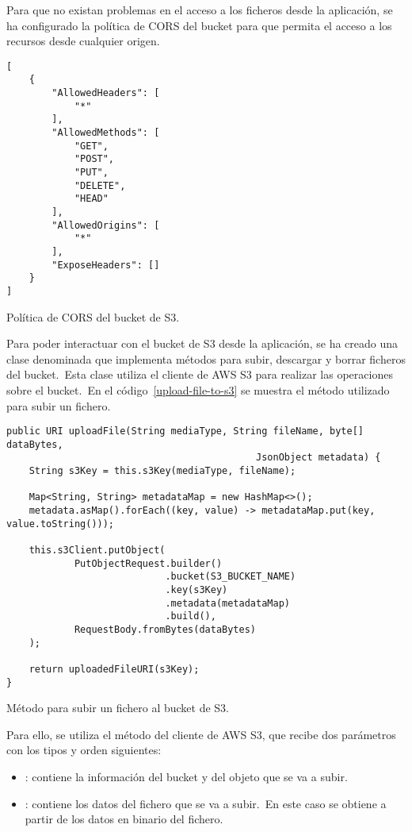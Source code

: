 Para que no existan problemas en el acceso a los ficheros desde la aplicación, se ha configurado la política de CORS
del bucket para que permita el acceso a los recursos desde cualquier origen.

\begin{codeBlock}
	\begin{verbatim}
[
	{
		"AllowedHeaders": [
			"*"
		],
		"AllowedMethods": [
			"GET",
			"POST",
			"PUT",
			"DELETE",
			"HEAD"
		],
		"AllowedOrigins": [
			"*"
		],
		"ExposeHeaders": []
	}
]
	\end{verbatim}
	\caption{Política de CORS del bucket de S3.}
\end{codeBlock}

Para poder interactuar con el bucket de S3 desde la aplicación, se ha creado una clase denominada  que
implementa métodos para subir, descargar y borrar ficheros del bucket.\ Esta clase utiliza el cliente de AWS S3
para realizar las operaciones sobre el bucket.\ En el código~\ref{upload-file-to-s3} se muestra el método utilizado
para subir un fichero.

\begin{codeBlock}
	\begin{verbatim}
public URI uploadFile(String mediaType, String fileName, byte[] dataBytes,
											JsonObject metadata) {
	String s3Key = this.s3Key(mediaType, fileName);

	Map<String, String> metadataMap = new HashMap<>();
	metadata.asMap().forEach((key, value) -> metadataMap.put(key, value.toString()));

	this.s3Client.putObject(
			PutObjectRequest.builder()
			                .bucket(S3_BUCKET_NAME)
			                .key(s3Key)
			                .metadata(metadataMap)
			                .build(),
			RequestBody.fromBytes(dataBytes)
	);

	return uploadedFileURI(s3Key);
}
	\end{verbatim}
	\caption{Método para subir un fichero al bucket de S3.}
	\label{upload-file-to-s3}
\end{codeBlock}

Para ello, se utiliza el método  del cliente de AWS S3, que recibe dos parámetros con los tipos y
orden siguientes:

\begin{itemize}
	\item {}: contiene la información del bucket y del objeto que se va a subir.
	\item {}: contiene los datos del fichero que se va a subir.\ En este caso se obtiene
	a partir de los datos en binario del fichero.
\end{itemize}
